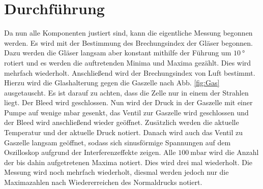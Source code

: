 \section{Durchführung}
 Da nun alle Komponenten justiert sind, kann die eigentliche Messung begonnen werden. Es wird mit der Bestimmung des Brechungsindex der Gläser begonnen. Dazu werden die Gläser langsam aber konstant mithilfe der Führung um $\SI{10}{\degree}$ rotiert und es werden die auftretenden Minima und Maxima gezählt. Dies wird mehrfach wiederholt. Anschließend wird der Brechungsindex von Luft bestimmt. Hierzu wird die Glashalterung gegen die Gaszelle  nach Abb. \ref{fig:Gas} ausgetauscht. Es ist darauf zu achten, dass die Zelle nur in einem der Strahlen liegt. Der Bleed wird geschlossen. Nun wird der Druck in der Gaszelle mit einer Pumpe auf wenige $\si{\milli\bar}$ gesenkt, das Ventil zur Gaszelle wird geschlossen und der Bleed wird anschließend wieder geöffnet. Zusätzlich werden die aktuelle Temperatur und der aktuelle Druck notiert. Danach wird auch das Ventil zu Gaszelle langsam geöffnet, sodass sich sinusförmige Spannungen auf dem Oszilloskop aufgrund der Interferenzeffekte zeigen. Alle $\SI{100}{\milli\bar}$ wird die Anzahl der bis dahin aufgetretenen Maxima notiert. Dies wird drei mal wiederholt. Die Messung wird noch mehrfach wiederholt, diesmal werden jedoch nur die Maximazahlen nach Wiedererreichen des Normaldrucks notiert. 